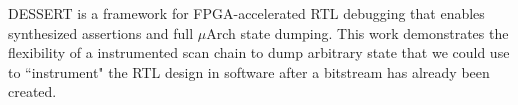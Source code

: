 \documentclass[sigconf]{acmart}
\begin{document}


DESSERT\cite{dessert} is a framework for FPGA-accelerated RTL debugging that enables synthesized assertions and full $\mu$Arch state dumping.
This work demonstrates the flexibility of a instrumented scan chain to dump arbitrary state that we could use to ``instrument" the RTL design in software after a bitstream has already been created.



\end{document}
